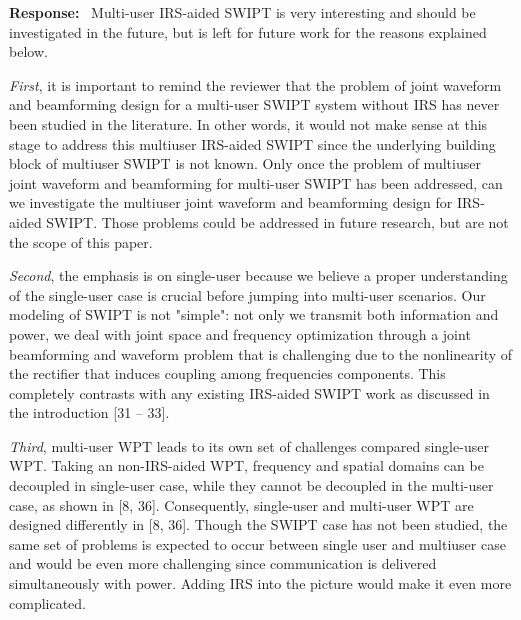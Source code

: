 \documentclass{article}
\newcounter{reviewer}
\newcounter{response}[reviewer]
\newenvironment{response}
	{\refstepcounter{response} \medskip \noindent \textbf{Response:}\ }
	{\medskip}
\begin{document}
\begin{reviewersection}
		\begin{response}
			Multi-user IRS-aided SWIPT is very interesting and should be investigated in the future, but is left for future work for the reasons explained below.

			\emph{First}, it is important to remind the reviewer that the problem of joint waveform and beamforming design for a multi-user SWIPT system without IRS has never been studied in the literature. In other words, it would not make sense at this stage to address this multiuser IRS-aided SWIPT since the underlying building block of multiuser SWIPT is not known. Only once the problem of multiuser joint waveform and beamforming for multi-user SWIPT has been addressed, can we investigate the multiuser joint waveform and beamforming design for IRS-aided SWIPT. Those problems could be addressed in future research, but are not the scope of this paper.

			\emph{Second}, the emphasis is on single-user because we believe a proper understanding of the single-user case is crucial before jumping into multi-user scenarios. Our modeling of SWIPT is not "simple": not only we transmit both information and power, we deal with joint space and frequency optimization through a joint beamforming and waveform problem that is challenging due to the nonlinearity of the rectifier that induces coupling among frequencies components. This completely contrasts with any existing IRS-aided SWIPT work as discussed in the introduction [31 -- 33].

			\emph{Third}, multi-user WPT leads to its own set of challenges compared single-user WPT. Taking an non-IRS-aided WPT, frequency and spatial domains can be decoupled in single-user case, while they cannot be decoupled in the multi-user case, as shown in [8, 36]. Consequently, single-user and multi-user WPT are designed differently in [8, 36]. Though the SWIPT case has not been studied, the same set of problems is expected to occur between single user and multiuser case and would be even more challenging since communication is delivered simultaneously with power. Adding IRS into the picture would make it even more complicated.
			\label{re:1.2}
		\end{response}


\end{reviewersection}
\end{document}
